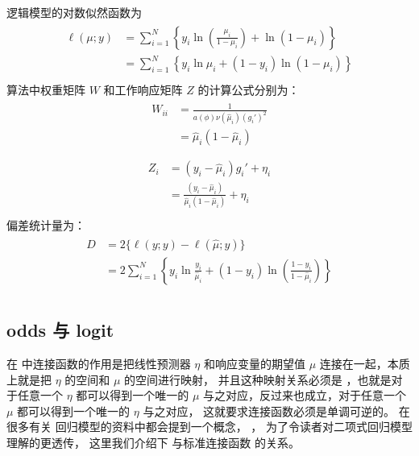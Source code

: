 \documentclass[letterpaper,10pt,english]{sphinxmanual}
\begin{document}
逻辑模型的对数似然函数为
\begin{align}\label{equation:二项模型/content:二项模型/content:13}\!\begin{aligned}
\ell(\mu;y) &= \sum_{i=1}^N \left \{  y_i \ln \left (\frac{\mu_i}{1-\mu_i} \right )
+ \ln(1-\mu_i) \right \}\\
&= \sum_{i=1}^N \left \{  y_i \ln \mu_i + (1-y_i)\ln(1-\mu_i) \right \}\\
\end{aligned}\end{align}
 算法中权重矩阵 \(W\) 和工作响应矩阵 \(Z\) 的计算公式分别为：
\begin{align}\label{equation:二项模型/content:二项模型/content:14}\!\begin{aligned}
W_{ii} &=  \frac{ 1}{ a(\phi) \nu(\hat{\mu}_i) ( g_i' )^2}\\
&=  \hat{\mu}_i (1-\hat{\mu}_i)\\
\end{aligned}\end{align}\begin{align}\label{equation:二项模型/content:二项模型/content:15}\!\begin{aligned}
Z_i &=  (y_i- \hat{\mu}_i) g_i'  + \eta_i\\
&= \frac{(y_i- \hat{\mu}_i)} {\hat{\mu}_i (1-\hat{\mu}_i)}  + \eta_i\\
\end{aligned}\end{align}
偏差统计量为：
\begin{align}\label{equation:二项模型/content:二项模型/content:16}\!\begin{aligned}
D &= 2 \{ \ell(y;y) - \ell(\hat{\mu};y) \}\\
&= 2 \sum_{i=1}^N \left \{ y_i\ln\frac{y_i}{\hat{\mu}_i}
+ (1-y_i)\ln\left ( \frac{1-y_i}{1-\hat{\mu}_i}   \right )     \right \}\\
\end{aligned}\end{align}

\subsection{odds 与 logit}
\label{\detokenize{_u4e8c_u9879_u6a21_u578b/content:odds-logit}}
在  中连接函数的作用是把线性预测器 \(\eta\) 和响应变量的期望值 \(\mu\)
连接在一起，本质上就是把 \(\eta\) 的空间和 \(\mu\) 的空间进行映射，
并且这种映射关系必须是  ，也就是对于任意一个 \(\eta\)
都可以得到一个唯一的 \(\mu\) 与之对应，反过来也成立，对于任意一个 \(\mu\)
都可以得到一个唯一的 \(\eta\) 与之对应，
这就要求连接函数必须是单调可逆的。
在很多有关   回归模型的资料中都会提到一个概念， ，
为了令读者对二项式回归模型理解的更透传，
这里我们介绍下  与标准连接函数  的关系。
\end{document}
